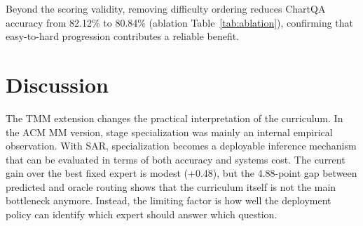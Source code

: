 \documentclass[journal]{IEEEtran}
\newcommand{\dacds}{DACDS}
\newcommand{\sar}{SAR}
\begin{document}
\begin{table}[!t]
\centering
\footnotesize
{}
\vspace{4pt}
\caption{Validation of trace-derived \dacds{} difficulty scores by question type. The assigned levels align monotonically with the mathematical complexity of the operations required to answer each question.}
\label{tab:difficulty_patterns}
\end{table}

Beyond the scoring validity, removing difficulty ordering reduces ChartQA accuracy from 82.12\% to 80.84\% (ablation Table~\ref{tab:ablation}), confirming that easy-to-hard progression contributes a reliable benefit.

\section{Discussion}
The TMM extension changes the practical interpretation of the curriculum.
In the ACM MM version, stage specialization was mainly an internal empirical observation.
With \sar{}, specialization becomes a deployable inference mechanism that can be evaluated in terms of both accuracy and systems cost.
The current gain over the best fixed expert is modest (+0.48), but the 4.88-point gap between predicted and oracle routing shows that the curriculum itself is not the main bottleneck anymore.
Instead, the limiting factor is how well the deployment policy can identify which expert should answer which question.
\end{document}
